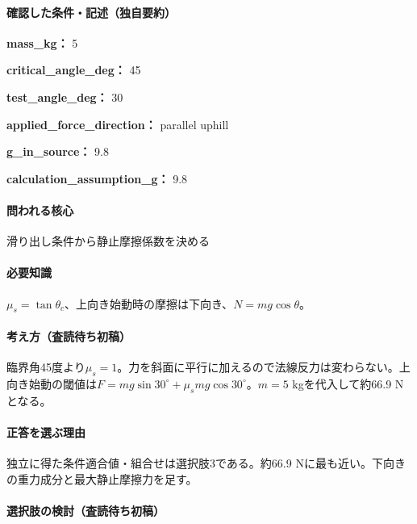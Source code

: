 \paragraph{確認した条件・記述（独自要約）}\mbox{}\par

\noindent\textbf{mass\_kg：} 5\par

\noindent\textbf{critical\_angle\_deg：} 45\par

\noindent\textbf{test\_angle\_deg：} 30\par

\noindent\textbf{applied\_force\_direction：} parallel uphill\par

\noindent\textbf{g\_in\_source：} 9.8\par

\noindent\textbf{calculation\_assumption\_g：} 9.8\par

\paragraph{問われる核心} 滑り出し条件から静止摩擦係数を決める

\paragraph{必要知識} \(\mu_s=\tan\theta_c\)、上向き始動時の摩擦は下向き、\(N=mg\cos\theta\)。

\paragraph{考え方（査読待ち初稿）} 臨界角45度より\(\mu_s=1\)。力を斜面に平行に加えるので法線反力は変わらない。上向き始動の閾値は\(F=mg\sin30^\circ+\mu_smg\cos30^\circ\)。\(m=5\) kgを代入して約66.9 Nとなる。

\paragraph{正答を選ぶ理由} 独立に得た条件適合値・組合せは選択肢3である。約66.9 Nに最も近い。下向きの重力成分と最大静止摩擦力を足す。

\paragraph{選択肢の検討（査読待ち初稿）}\mbox{}\par

